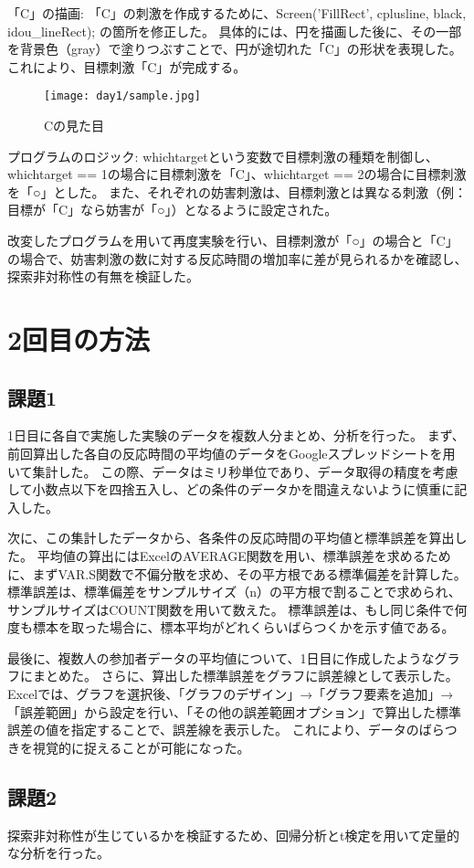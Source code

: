 \documentclass{jlreq}
\begin{document}
「C」の描画: 「C」の刺激を作成するために、Screen('FillRect', cplusline, black, idou\_lineRect);  の箇所を修正した。
具体的には、円を描画した後に、その一部を背景色（gray）で塗りつぶすことで、円が途切れた「C」の形状を表現した。
これにより、目標刺激「C」が完成する。
\begin{figure}[H]
    \centering
    \texttt{[image: day1/sample.jpg]}
    \caption{Cの見た目}
    \label{fig:kadai1}
\end{figure}
プログラムのロジック: whichtargetという変数で目標刺激の種類を制御し、whichtarget == 1の場合に目標刺激を「C」、whichtarget == 2の場合に目標刺激を「○」とした。
また、それぞれの妨害刺激は、目標刺激とは異なる刺激（例：目標が「C」なら妨害が「○」）となるように設定された。

改変したプログラムを用いて再度実験を行い、目標刺激が「○」の場合と「C」の場合で、妨害刺激の数に対する反応時間の増加率に差が見られるかを確認し、探索非対称性の有無を検証した。


\section{2回目の方法}
\subsection{課題1}
1日目に各自で実施した実験のデータを複数人分まとめ、分析を行った。
まず、前回算出した各自の反応時間の平均値のデータをGoogleスプレッドシートを用いて集計した。
この際、データはミリ秒単位であり、データ取得の精度を考慮して小数点以下を四捨五入し、どの条件のデータかを間違えないように慎重に記入した。

次に、この集計したデータから、各条件の反応時間の平均値と標準誤差を算出した。
平均値の算出にはExcelのAVERAGE関数を用い、標準誤差を求めるために、まずVAR.S関数で不偏分散を求め、その平方根である標準偏差を計算した。
標準誤差は、標準偏差をサンプルサイズ（n）の平方根で割ることで求められ、サンプルサイズはCOUNT関数を用いて数えた。
標準誤差は、もし同じ条件で何度も標本を取った場合に、標本平均がどれくらいばらつくかを示す値である。

最後に、複数人の参加者データの平均値について、1日目に作成したようなグラフにまとめた。
さらに、算出した標準誤差をグラフに誤差線として表示した。
Excelでは、グラフを選択後、「グラフのデザイン」→「グラフ要素を追加」→「誤差範囲」から設定を行い、「その他の誤差範囲オプション」で算出した標準誤差の値を指定することで、誤差線を表示した。
これにより、データのばらつきを視覚的に捉えることが可能になった。
\subsection{課題2}
探索非対称性が生じているかを検証するため、回帰分析とt検定を用いて定量的な分析を行った。
\end{document}
